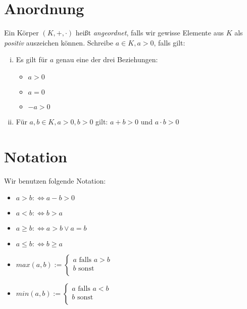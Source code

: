 \documentclass{scrreprt}
\begin{document}
    \section{Anordnung}
    Ein Körper $(K, +, \cdot)$ heißt \emph{angeordnet}, falls wir gewisse Elemente aus $K$ als \emph{positiv} auszeichen können. Schreibe $a \in K, a > 0$, falls gilt:
    \begin{enumerate}[i)]
        \item
            Es gilt für $a$ genau eine der drei Beziehungen:
            \begin{itemize}
                \item
                    $a > 0$
                \item
                    $a = 0$
                \item
                    $-a >0$
            \end{itemize}
        \item
            Für $a,b \in K, a > 0, b >0$ gilt: $a + b > 0$ und $a \cdot b > 0 $
    \end{enumerate}

    \section{Notation}
    Wir benutzen folgende Notation:
    \begin{itemize}
        \item
            $a > b :\Leftrightarrow a-b > 0$
        \item
            $a < b :\Leftrightarrow b > a$
        \item
            $a \geq b:\Leftrightarrow a > b \lor a = b$
        \item
            $a \leq b:\Leftrightarrow b \geq a$
        \item
            $max(a,b) :=
            \begin{cases}
                a \text{ falls } a > b \\
                b \text{ sonst }\\
            \end{cases}
            $
        \item
            $min(a,b) := 
            \begin{cases}
                a \text{ falls } a < b \\
                b \text{ sonst }\\
            \end{cases}
            $
    \end{itemize}
\end{document}

